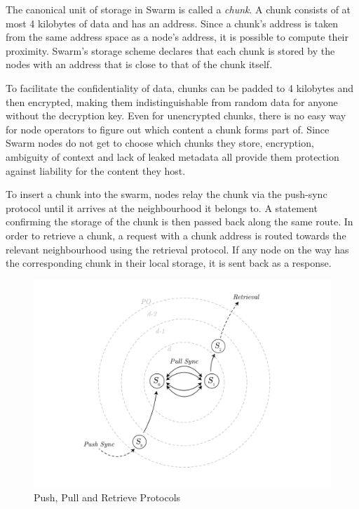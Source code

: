 \documentclass[12pt,a4paper]{article}
\begin{document}
The canonical unit of storage in Swarm is called a \emph{chunk}. A chunk consists of at most 4 kilobytes of data and has an address. Since a chunk’s address is taken from the same address space as a node’s address, it is possible to compute their proximity. Swarm’s storage scheme declares that each chunk is stored by the nodes with an address that is close to that of the chunk itself. 


To facilitate the confidentiality of data, chunks can be padded to 4 kilobytes and then encrypted, making them indistinguishable from random data for anyone without the decryption key. Even for unencrypted chunks, there is no easy way for node operators to figure out which content a chunk forms part of. Since Swarm nodes do not get to choose which chunks they store, encryption, ambiguity of context and lack of leaked metadata all provide them protection against liability for the content they host.

To insert a chunk into the swarm, nodes relay the chunk via the push-sync protocol until it arrives at the neighbourhood it belongs to. A statement confirming the storage of the chunk is then passed back along the same route. In order to retrieve a chunk, a request with a chunk address is routed towards the relevant neighbourhood using the retrieval protocol. If any node on the way has the corresponding chunk in their local storage, it is sent back as a response.

\begin{figure}[htbp]
  \centering
    \includegraphics[width=\textwidth]{fig2/pull-push-retrieve.pdf}
  \caption[Push, Pull and Retrieve Protocols]{Push, Pull and Retrieve Protocols}
\label{fig:push-pull-retrieve}
\end{figure}
\end{document}
